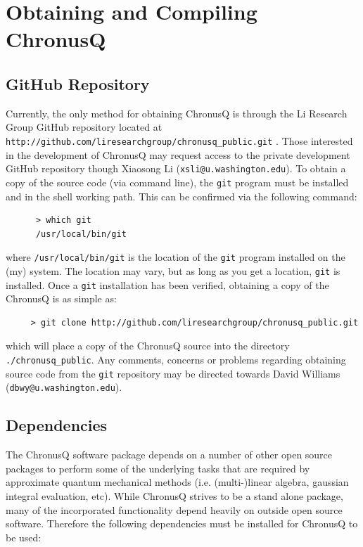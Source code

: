 \documentclass[12pt]{article}
\makeatletter
\newcommand{\ChronusQGitHubPUBLIC}{
  \texttt{http://github.com/liresearchgroup/chronusq\_public.git}
}
\newcommand{\XiaosongContact}{Xiaosong Li (\texttt{xsli@u.washington.edu})}
\newcommand{\DBWYContact}{David Williams (\texttt{dbwy@u.washington.edu})}
\makeatother
\begin{document}
  \section{Obtaining and Compiling ChronusQ} \label{sec:ObtainAndCompile}
    \subsection{GitHub Repository} \label{subsec:ChronusQGitHub}

    Currently, the only method for obtaining ChronusQ is through the Li Research
    Group GitHub repository located at \ChronusQGitHubPUBLIC. Those interested in
    the development of ChronusQ may request access to the private development GitHub
    repository though \XiaosongContact. To obtain a copy of the source code (via 
    command line), the \texttt{git} program must be installed and in the shell 
    working path. This can be confirmed via the following command:

    \begin{lstlisting}
      > which git
      /usr/local/bin/git
    \end{lstlisting}
    where \texttt{/usr/local/bin/git} is the location of the \texttt{git} program 
    installed on the (my) system. The location may vary, but as long as you get a 
    location, \texttt{git} is installed. Once a \texttt{git} installation has been 
    verified, obtaining a copy of the ChronusQ is as simple as:

    \begin{lstlisting}
     > git clone http://github.com/liresearchgroup/chronusq_public.git
    \end{lstlisting}
    which will place a copy of the ChronusQ source into the directory 
    \texttt{./chronusq\_public}. Any comments, concerns or problems regarding 
    obtaining source code from the \texttt{git} repository may be directed 
    towards \DBWYContact. 

    \subsection{Dependencies} \label{subsec:ChronusQDeps}

    The ChronusQ software package depends on a number of other open source packages
    to perform some of the underlying tasks that are required by approximate
    quantum mechanical methods (i.e. (multi-)linear algebra, gaussian integral 
    evaluation, etc). While ChronusQ strives to be a stand alone package, many
    of the incorporated functionality depend heavily on outside open source 
    software. Therefore the following dependencies must be installed for ChronusQ
    to be used:
    
\end{document}
